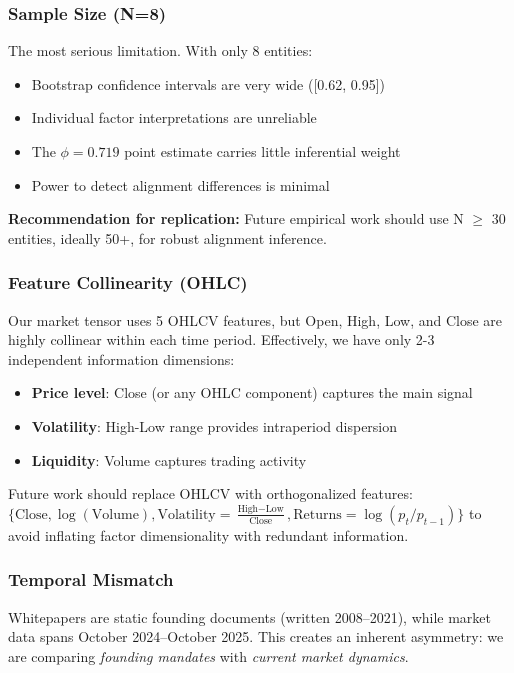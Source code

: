 \documentclass[11pt,twocolumn]{article}
\begin{document}
\subsubsection{Sample Size (N=8)}

The most serious limitation. With only 8 entities:
\begin{itemize}[leftmargin=*]
    \item Bootstrap confidence intervals are very wide ([0.62, 0.95])
    \item Individual factor interpretations are unreliable
    \item The $\phi = 0.719$ point estimate carries little inferential weight
    \item Power to detect alignment differences is minimal
\end{itemize}

\textbf{Recommendation for replication:} Future empirical work should use N $\geq$ 30 entities, ideally 50+, for robust alignment inference.

\subsubsection{Feature Collinearity (OHLC)}

Our market tensor uses 5 OHLCV features, but Open, High, Low, and Close are highly collinear within each time period. Effectively, we have only 2-3 independent information dimensions:
\begin{itemize}[leftmargin=*]
    \item \textbf{Price level}: Close (or any OHLC component) captures the main signal
    \item \textbf{Volatility}: High-Low range provides intraperiod dispersion
    \item \textbf{Liquidity}: Volume captures trading activity
\end{itemize}

Future work should replace OHLCV with orthogonalized features: $\{\text{Close}, \log(\text{Volume}), \text{Volatility} = \frac{\text{High}-\text{Low}}{\text{Close}}, \text{Returns} = \log(p_t/p_{t-1})\}$ to avoid inflating factor dimensionality with redundant information.

\subsubsection{Temporal Mismatch}

Whitepapers are static founding documents (written 2008--2021), while market data spans October 2024--October 2025. This creates an inherent asymmetry: we are comparing \textit{founding mandates} with \textit{current market dynamics}.
\end{document}
